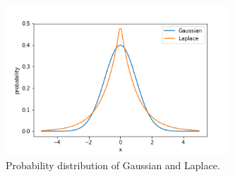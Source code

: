 \documentclass[a4paper,11pt]{article}
\begin{document}
\begin{pmisolution}
\begin{figure}[t]
\centering
\includegraphics[height=2.2in]{question_1.png}
\caption{Probability distribution of Gaussian and Laplace.} 
\label{fig:q1}
\end{figure}


\end{pmisolution}
\end{document}
